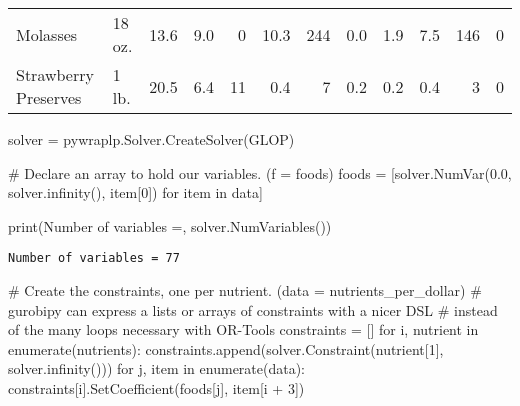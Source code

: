 \documentclass[
  ignorenonframetext,
]{beamer}
\newenvironment{Shaded}{\begin{snugshade}}{\end{snugshade}}
\newcommand{\BuiltInTok}[1]{\textcolor[rgb]{0.00,0.23,0.31}{#1}}
\newcommand{\CommentTok}[1]{\textcolor[rgb]{0.37,0.37,0.37}{#1}}
\newcommand{\ControlFlowTok}[1]{\textcolor[rgb]{0.00,0.23,0.31}{#1}}
\newcommand{\DecValTok}[1]{\textcolor[rgb]{0.68,0.00,0.00}{#1}}
\newcommand{\FloatTok}[1]{\textcolor[rgb]{0.68,0.00,0.00}{#1}}
\newcommand{\KeywordTok}[1]{\textcolor[rgb]{0.00,0.23,0.31}{#1}}
\newcommand{\NormalTok}[1]{\textcolor[rgb]{0.00,0.23,0.31}{#1}}
\newcommand{\OperatorTok}[1]{\textcolor[rgb]{0.37,0.37,0.37}{#1}}
\newcommand{\StringTok}[1]{\textcolor[rgb]{0.13,0.47,0.30}{#1}}
\begin{document}
\begin{frame}[fragile]
\begin{tabular}{llrrrrrrrrrr}
Molasses                &      18 oz. &                13.6 &       9.0 &            0 &         10.3 &        244 &             0.0 &            1.9 &              7.5 &          146 &                   0 \\
Strawberry Preserves    &       1 lb. &                20.5 &       6.4 &           11 &          0.4 &          7 &             0.2 &            0.2 &              0.4 &            3 &                   0 \\
\bottomrule
\end{tabular}
\end{frame}

\begin{frame}[fragile]
\begin{Shaded}
\begin{Highlighting}[]
\NormalTok{solver }\OperatorTok{=}\NormalTok{ pywraplp.Solver.CreateSolver(}\StringTok{\textquotesingle{}GLOP\textquotesingle{}}\NormalTok{)}
\end{Highlighting}
\end{Shaded}

\pause

\begin{Shaded}
\begin{Highlighting}[]
\CommentTok{\# Declare an array to hold our variables. (f = foods)}
\NormalTok{foods }\OperatorTok{=}\NormalTok{ [solver.NumVar(}\FloatTok{0.0}\NormalTok{, solver.infinity(), item[}\DecValTok{0}\NormalTok{]) }\ControlFlowTok{for}\NormalTok{ item }\KeywordTok{in}\NormalTok{ data]}

\BuiltInTok{print}\NormalTok{(}\StringTok{\textquotesingle{}Number of variables =\textquotesingle{}}\NormalTok{, solver.NumVariables())}
\end{Highlighting}
\end{Shaded}

\begin{verbatim}
Number of variables = 77
\end{verbatim}

\pause

\begin{Shaded}
\begin{Highlighting}[]
\CommentTok{\# Create the constraints, one per nutrient. (data = nutrients\_per\_dollar)}
\CommentTok{\# gurobipy can express a lists or arrays of constraints with a nicer DSL }
\CommentTok{\# instead of the many loops necessary with OR{-}Tools}
\NormalTok{constraints }\OperatorTok{=}\NormalTok{ []}
\ControlFlowTok{for}\NormalTok{ i, nutrient }\KeywordTok{in} \BuiltInTok{enumerate}\NormalTok{(nutrients):}
\NormalTok{    constraints.append(solver.Constraint(nutrient[}\DecValTok{1}\NormalTok{], solver.infinity()))}
    \ControlFlowTok{for}\NormalTok{ j, item }\KeywordTok{in} \BuiltInTok{enumerate}\NormalTok{(data):}
\NormalTok{        constraints[i].SetCoefficient(foods[j], item[i }\OperatorTok{+} \DecValTok{3}\NormalTok{])}


\end{Highlighting}
\end{Shaded}
\end{frame}
\end{document}
